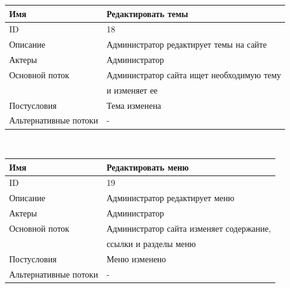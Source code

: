 \begin{center}
    \begin{tabular}{|l|l|}
        \hline
        Имя                   & Редактировать темы                        \\
        \hline
        ID                    & 18                                        \\
        \hline
        Описание              & Администратор редактирует темы на сайте   \\
        \hline
        Актеры                & Администратор                             \\
        \hline
        Основной поток        & Администратор сайта ищет необходимую тему \\
        & и изменяет ее                             \\
        \hline
        Постусловия           & Тема изменена                             \\
        \hline
        Альтернативные потоки & -                                         \\
        \hline
    \end{tabular}\\
    \vspace{0.5cm}
    \begin{tabular}{|l|l|}
        \hline
        Имя                   & Редактировать меню                       \\
        \hline
        ID                    & 19                                       \\
        \hline
        Описание              & Администратор редактирует меню           \\
        \hline
        Актеры                & Администратор                            \\
        \hline
        Основной поток        & Администратор сайта изменяет содержание, \\
        & ссылки и разделы меню                    \\
        \hline
        Постусловия           & Меню изменено                            \\
        \hline
        Альтернативные потоки & -                                        \\
        \hline
    \end{tabular}\\
\end{center}
\newpage
\BgThispage
